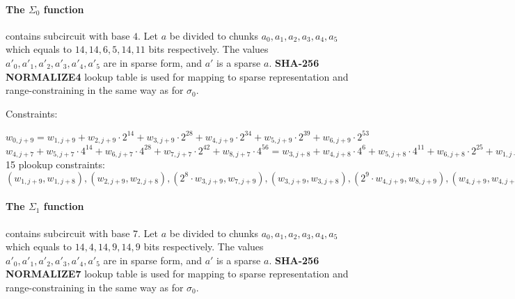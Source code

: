 \paragraph{The $\Sigma_0$ function}
contains subcircuit with base $4$.
Let $a$ be divided to chunks $a_0, a_1, a_2, a_3, a_4, a_5$ which equals to $14, 14, 6, 5, 14, 11$ bits respectively.
The values $a'_0, a'_1, a'_2, a'_3, a'_4, a'_5$ are in sparse form, and $a'$ is a sparse $a$.
\textbf{SHA-256 NORMALIZE4} lookup table is used for mapping to sparse representation and range-constraining in the same way as for $\sigma_0$.

Constraints:
\begin{center}
    $w_{0, j + 9} = w_{1, j + 9} + w_{2, j + 9} \cdot 2^{14} + w_{3, j + 9} \cdot 2^{28} + w_{4, j + 9} \cdot 2^{34} + w_{5, j + 9} \cdot 2^{39} + w_{6,  j + 9}\cdot 2^{53}$ \\
    $w_{4, j + 7} + w_{5, j + 7} \cdot 4^{14} + w_{6, j + 7} \cdot 4^{28} + w_{7, j + 7} \cdot 2^{42} + w_{8, j + 7} \cdot 4^{56} = w_{3, j + 8} + w_{4, j + 8} \cdot 4^6 + w_{5, j + 8} \cdot 4^{11} + w_{6, j + 8} \cdot 2^{25} + w_{1, j + 8} \cdot 4^{36} + w_{2, j + 8} \cdot 4^{50} + 
     w_{4, j + 8} + w_{5, j + 8} \cdot 4^{5} + w_{6, j + 8} \cdot 4^{19} + w_{1, j + 8} \cdot 2^{30} + w_{2, j + 8} \cdot 4^{44} + w_{3, j + 8} \cdot 4^{58} +
     w_{5, j + 8} + w_{6, j + 8} \cdot 4^{14} + w_{1, j + 8} \cdot 4^{25} + w_{2, j + 8} \cdot 2^{39} + w_{3, j + 8} \cdot 4^{53} + w_{4, j + 8} \cdot 4^{59}$ \\
    15 plookup constraints: $(w_{1, j + 9}, w_{1, j + 8}), (w_{2, j + 9}, w_{2, j + 8}), ( 2^{8} \cdot w_{3, j + 9}, w_{7, j + 9}), (w_{3, j + 9}, w_{3, j + 8}), (2^9 \cdot w_{4, j + 9}, w_{8, j + 9}), (w_{4, j + 9}, w_{4, j + 8}), (w_{5, j + 9}, w_{5, j + 8}), (2^3 \cdot w_{6, j + 9}, w_{7, j + 8}), (w_{6, j + 9}, w_{6, j + 8}), (w_{4, j + 6}, w_{4, j + 7}), (w_{5, j + 6}, w_{5, j + 7}), (w_{6, j + 6}, w_{6, j + 7}), (w_{7, j + 6}, w_{7, j + 7}), (w_{8, j + 6}, w_{8, j + 7}), (2^6 \cdot w_{8, j + 7}, w_{3, j + 7})$
\end{center}
\paragraph{The $\Sigma_1$ function}
contains subcircuit with base $7$.
Let $a$ be divided to chunks $a_0, a_1, a_2, a_3, a_4, a_5$ which equals to $14, 4, 14, 9, 14, 9$ bits respectively.
The values $a'_0, a'_1, a'_2, a'_3, a'_4, a'_5$ are in sparse form, and $a'$ is a sparse $a$.
\textbf{SHA-256 NORMALIZE7} lookup table is used for mapping to sparse representation and range-constraining in the same way as for $\sigma_0$.


